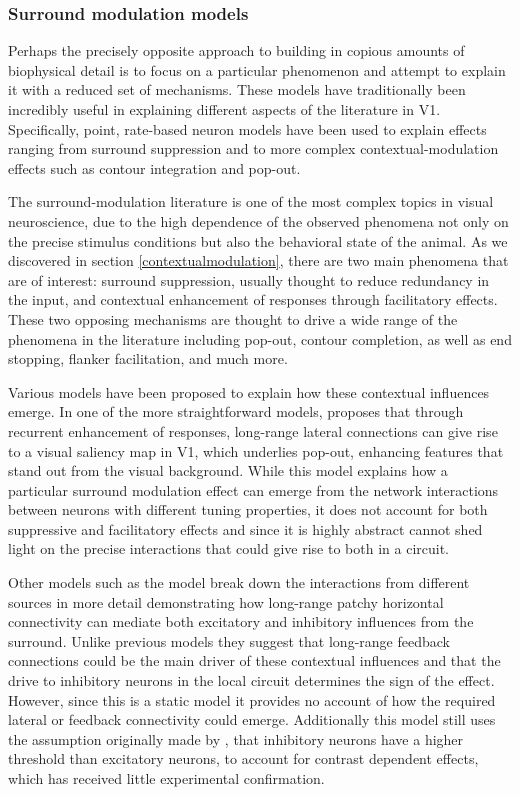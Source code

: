 \subsubsection{Surround modulation models} \label{SRmodels}

Perhaps the precisely opposite approach to building in copious amounts
of biophysical detail is to focus on a particular phenomenon and
attempt to explain it with a reduced set of mechanisms. These models
have traditionally been incredibly useful in explaining different
aspects of the literature in V1. Specifically, point, rate-based
neuron models have been used to explain effects ranging from surround
suppression and to more complex contextual-modulation effects such as
contour integration and pop-out.

The surround-modulation literature is one of the most complex topics
in visual neuroscience, due to the high dependence of the observed
phenomena not only on the precise stimulus conditions but also the
behavioral state of the animal. As we discovered in section
\ref{contextualmodulation}, there are two main phenomena that are of
interest: surround suppression, usually thought to reduce redundancy
in the input, and contextual enhancement of responses through
facilitatory effects. These two opposing mechanisms are thought to
drive a wide range of the phenomena in the literature including
pop-out, contour completion, as well as end stopping, flanker
facilitation, and much more.

Various models have been proposed to explain how these contextual
influences emerge. In one of the more straightforward models,
\cite{Li2002} proposes that through recurrent enhancement of
responses, long-range lateral connections can give rise to a visual
saliency map in V1, which underlies pop-out, enhancing features that
stand out from the visual background. While this model explains how a
particular surround modulation effect can emerge from the network
interactions between neurons with different tuning properties, it does
not account for both suppressive and facilitatory effects and since it
is highly abstract cannot shed light on the precise interactions that
could give rise to both in a circuit.

Other models such as the \cite{Schwabe2006} model break down the
interactions from different sources in more detail demonstrating how
long-range patchy horizontal connectivity can mediate both excitatory
and inhibitory influences from the surround. Unlike previous models
they suggest that long-range feedback connections could be the main
driver of these contextual influences and that the drive to inhibitory
neurons in the local circuit determines the sign of the
effect. However, since this is a static model it provides no account
of how the required lateral or feedback connectivity could
emerge. Additionally this model still uses the assumption originally
made by \cite{Somers1998}, that inhibitory neurons have a higher
threshold than excitatory neurons, to account for contrast dependent
effects, which has received little experimental confirmation.


